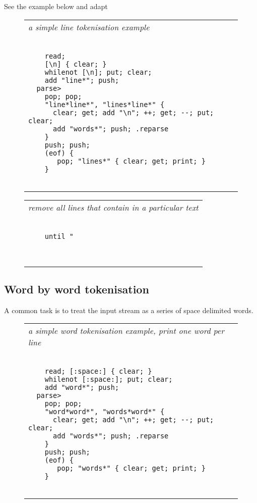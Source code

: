 \documentclass[a4paper,12pt]{article}
\begin{document}
  See the example below and adapt
 \begin{figure}
 \begin{tabular}{ l }
 \emph{ a simple line tokenisation example } \\ 
 \begin{lstlisting}[breaklines] 

    read; 
    [\n] { clear; }
    whilenot [\n]; put; clear;
    add "line*"; push;
  parse>
    pop; pop; 
    "line*line*", "lines*line*" {
      clear; get; add "\n"; ++; get; --; put; clear;
      add "words*"; push; .reparse
    }
    push; push;
    (eof) {
       pop; "lines*" { clear; get; print; }
    }
  
 \end{lstlisting} 
 \end{tabular} 

 \end{figure}
 \begin{figure}
 \begin{tabular}{ l }
 \emph{ remove all lines that contain in a particular text  } \\ 
 \begin{lstlisting}[breaklines] 

    until "

  
 \end{lstlisting} 
 \end{tabular} 

 \end{figure}

\subsection{Word by word tokenisation}

  A common task is to treat the input stream as a series of space
  delimited words.
 \begin{figure}
 \begin{tabular}{ l }
 \emph{ a simple word tokenisation example, print one word per line } \\ 
 \begin{lstlisting}[breaklines] 

    read; [:space:] { clear; }
    whilenot [:space:]; put; clear;
    add "word*"; push;
  parse>
    pop; pop; 
    "word*word*", "words*word*" {
      clear; get; add "\n"; ++; get; --; put; clear;
      add "words*"; push; .reparse
    }
    push; push;
    (eof) {
       pop; "words*" { clear; get; print; }
    }
  
 \end{lstlisting} 
 \end{tabular} 

 \end{figure}
\end{document}
